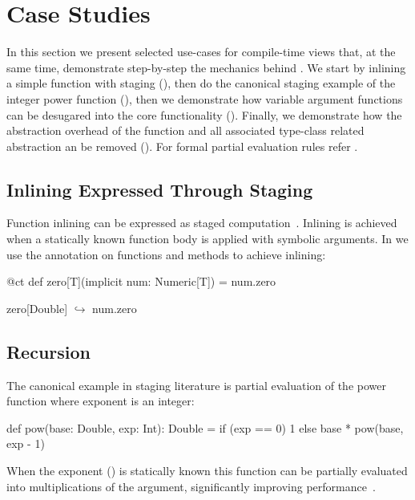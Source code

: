 \section{Case Studies}
\label{sct:case-studies}

In this section we present selected use-cases for compile-time views that, at the
same time, demonstrate step-by-step the mechanics behind \tool. We start by inlining a simple function with staging
(), then do the canonical staging  example of the integer power function
(), then we demonstrate how variable argument functions can
be  desugared into the core functionality (). Finally, we
demonstrate how the abstraction overhead of the  function and all
associated type-class related abstraction an be removed ().
For formal partial evaluation rules refer \cf {}.

\subsection{Inlining Expressed Through Staging}
\label{sct:inlining}

Function inlining can be expressed as staged computation~\cite{monnier2003inlining}.
 Inlining is achieved when a statically known function body is applied with symbolic
 arguments. In \tool we use the  annotation on functions and methods to achieve inlining:\begin{lstparagraph}
@ct def zero[T](implicit num: Numeric[T]) = num.zero

zero[Double]
  $\hookrightarrow$ num.zero
\end{lstparagraph}


\subsection{Recursion}
\label{sct:recursion}

The canonical example in staging literature is partial evaluation of the power function
 where exponent is an integer:
\begin{lstparagraph}
def pow(base: Double, exp: Int): Double =
  if (exp == 0) 1 else base * pow(base, exp - 1)
\end{lstparagraph} When the exponent () is statically known this function can be partially
evaluated into  multiplications of the  argument, significantly
improving performance~\cite{calcagno2003implementing}.


